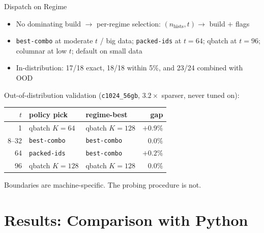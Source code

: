 \documentclass[aspectratio=169,10pt]{beamer}
\newcommand{\bcombo}{\texttt{best-combo}}
\newcommand{\good}[1]{\textcolor{green!50!black}{#1}}
\begin{document}
\begin{frame}{Dispatch on Regime}
  \begin{itemize}
    \item No dominating build $\to$ per-regime selection: $(n_\text{hists}, t) \to$ build $+$ flags
    \item \bcombo{} at moderate $t$ / big data; \texttt{packed-ids} at $t{=}64$; qbatch at $t{=}96$; columnar at low $t$; default on small data
    \item In-distribution: \good{17/18} exact, \good{18/18} within 5\%, and \good{23/24} combined with OOD
  \end{itemize}
  \smallskip
  Out-of-distribution validation (\texttt{c1024\_56gb}, $3.2\times$ sparser, never tuned on):
  \begin{center}
    \footnotesize
    \begin{tabular}{rllr}
      \toprule
      $t$ & policy pick & regime-best & gap \\
      \midrule
      1 & qbatch $K{=}64$ & qbatch $K{=}128$ & \good{$+0.9\%$} \\
      8--32 & \bcombo{} & \bcombo{} & \good{$0.0\%$} \\
      64 & \texttt{packed-ids} & \bcombo{} & \good{$+0.2\%$} \\
      96 & qbatch $K{=}128$ & qbatch $K{=}128$ & \good{$0.0\%$} \\
      \bottomrule
    \end{tabular}
  \end{center}
  \smallskip
  Boundaries are machine-specific. The probing procedure is not.
\end{frame}

\section{Results: Comparison with Python}
\end{document}
